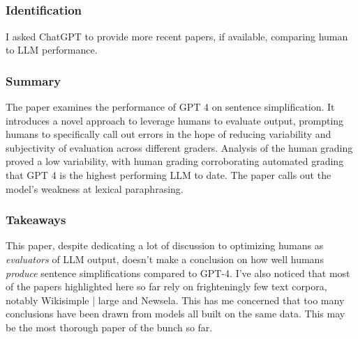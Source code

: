 \documentclass[
	letterpaper, %
]{jdf}
\begin{document}
\subsection{}
\subsubsection{Identification}
I asked ChatGPT to provide more recent papers, if available, comparing human to LLM performance.

\subsubsection{Summary}
The paper examines the performance of GPT 4 on sentence simplification. It introduces a novel approach to leverage humans to evaluate output, prompting humans to specifically call out errors in the hope of reducing variability and subjectivity of evaluation across different graders. Analysis of the human grading proved a low variability, with human grading corroborating automated grading that GPT 4 is the highest performing LLM to date. The paper calls out the model's weakness at lexical paraphrasing.

\subsubsection{Takeaways}
This paper, despite dedicating a lot of discussion to optimizing humans as \textit{evaluators} of LLM output, doesn't make a conclusion on how well humans \textit{produce} sentence simplifications compared to GPT-4. I've also noticed that most of the papers highlighted here so far rely on frighteningly few text corpora, notably Wiki{simple | large} and Newsela. This has me concerned that too many conclusions have been drawn from models all built on the same data. This may be the most thorough paper of the bunch so far.

\subsection{}
\end{document}
